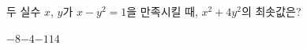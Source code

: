 두 실수 $x$, $y$가 $x-y^2=1$을 만족시킬 때, $x^2+4y^2$의 최솟값은?
\begin{choices32}{$-8$}{$-4$}{$-1$}{$1$}{$4$}\end{choices32}
